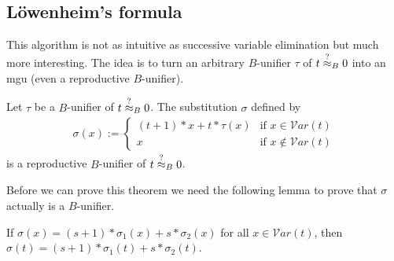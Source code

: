 		\subsection{Löwenheim's formula}
		This algorithm is not as intuitive as successive variable elimination but much more interesting. The idea is to turn an arbitrary $B$-unifier $\tau$ of $t\stackrel{?}{\approx}_B0$ into an mgu (even a reproductive $B$-unifier).
		\begin{theorem}\label{lowenheim}
		Let $\tau$ be a $B$-unifier of $t\stackrel{?}{\approx}_B0$. The substitution $\sigma$ defined by
		\begin{align*}
		\sigma(x):=\begin{cases}
		(t+1)*x+t*\tau(x) &\text{if }x\in\mathcal{V}ar(t) \\
		x &\text{if }x\notin\mathcal{V}ar(t)
		\end{cases}
		\end{align*}
		is a reproductive $B$-unifier of $t\stackrel{?}{\approx}_B0$.
		\end{theorem}
		Before we can prove this theorem we need the following lemma to prove that $\sigma$ actually is a $B$-unifier. 
		\begin{lemma}\label{lowenLemma}
		If $\sigma(x)=(s+1)*\sigma_1(x)+s*\sigma_2(x)$ for all $x\in\mathcal{V}ar(t)$, then $\sigma(t)=(s+1)*\sigma_1(t)+s*\sigma_2(t)$.
		\end{lemma}
